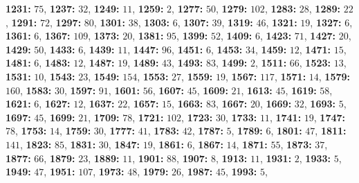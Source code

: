 \textsf{\bfseries 1231:} $75$, \textsf{\bfseries 1237:} $32$, \textsf{\bfseries 1249:} $11$, \textsf{\bfseries 1259:} $2$, \textsf{\bfseries 1277:} $50$, \textsf{\bfseries 1279:} $102$, \textsf{\bfseries 1283:} $28$, \textsf{\bfseries 1289:} $22$, \textsf{\bfseries 1291:} $72$, \textsf{\bfseries 1297:} $80$, \textsf{\bfseries 1301:} $38$, \textsf{\bfseries 1303:} $6$, \textsf{\bfseries 1307:} $39$, \textsf{\bfseries 1319:} $46$, \textsf{\bfseries 1321:} $19$, \textsf{\bfseries 1327:} $6$, \textsf{\bfseries 1361:} $6$, \textsf{\bfseries 1367:} $109$, \textsf{\bfseries 1373:} $20$, \textsf{\bfseries 1381:} $95$, \textsf{\bfseries 1399:} $52$, \textsf{\bfseries 1409:} $6$, \textsf{\bfseries 1423:} $71$, \textsf{\bfseries 1427:} $20$, \textsf{\bfseries 1429:} $50$, \textsf{\bfseries 1433:} $6$, \textsf{\bfseries 1439:} $11$, \textsf{\bfseries 1447:} $96$, \textsf{\bfseries 1451:} $6$, \textsf{\bfseries 1453:} $34$, \textsf{\bfseries 1459:} $12$, \textsf{\bfseries 1471:} $15$, \textsf{\bfseries 1481:} $6$, \textsf{\bfseries 1483:} $12$, \textsf{\bfseries 1487:} $19$, \textsf{\bfseries 1489:} $43$, \textsf{\bfseries 1493:} $83$, \textsf{\bfseries 1499:} $2$, \textsf{\bfseries 1511:} $66$, \textsf{\bfseries 1523:} $13$, \textsf{\bfseries 1531:} $10$, \textsf{\bfseries 1543:} $23$, \textsf{\bfseries 1549:} $154$, \textsf{\bfseries 1553:} $27$, \textsf{\bfseries 1559:} $19$, \textsf{\bfseries 1567:} $117$, \textsf{\bfseries 1571:} $14$, \textsf{\bfseries 1579:} $160$, \textsf{\bfseries 1583:} $30$, \textsf{\bfseries 1597:} $91$, \textsf{\bfseries 1601:} $56$, \textsf{\bfseries 1607:} $45$, \textsf{\bfseries 1609:} $21$, \textsf{\bfseries 1613:} $45$, \textsf{\bfseries 1619:} $58$, \textsf{\bfseries 1621:} $6$, \textsf{\bfseries 1627:} $12$, \textsf{\bfseries 1637:} $22$, \textsf{\bfseries 1657:} $15$, \textsf{\bfseries 1663:} $83$, \textsf{\bfseries 1667:} $20$, \textsf{\bfseries 1669:} $32$, \textsf{\bfseries 1693:} $5$, \textsf{\bfseries 1697:} $45$, \textsf{\bfseries 1699:} $21$, \textsf{\bfseries 1709:} $78$, \textsf{\bfseries 1721:} $102$, \textsf{\bfseries 1723:} $30$, \textsf{\bfseries 1733:} $11$, \textsf{\bfseries 1741:} $19$, \textsf{\bfseries 1747:} $78$, \textsf{\bfseries 1753:} $14$, \textsf{\bfseries 1759:} $30$, \textsf{\bfseries 1777:} $41$, \textsf{\bfseries 1783:} $42$, \textsf{\bfseries 1787:} $5$, \textsf{\bfseries 1789:} $6$, \textsf{\bfseries 1801:} $47$, \textsf{\bfseries 1811:} $141$, \textsf{\bfseries 1823:} $85$, \textsf{\bfseries 1831:} $30$, \textsf{\bfseries 1847:} $19$, \textsf{\bfseries 1861:} $6$, \textsf{\bfseries 1867:} $14$, \textsf{\bfseries 1871:} $55$, \textsf{\bfseries 1873:} $37$, \textsf{\bfseries 1877:} $66$, \textsf{\bfseries 1879:} $23$, \textsf{\bfseries 1889:} $11$, \textsf{\bfseries 1901:} $88$, \textsf{\bfseries 1907:} $8$, \textsf{\bfseries 1913:} $11$, \textsf{\bfseries 1931:} $2$, \textsf{\bfseries 1933:} $5$, \textsf{\bfseries 1949:} $47$, \textsf{\bfseries 1951:} $107$, \textsf{\bfseries 1973:} $48$, \textsf{\bfseries 1979:} $26$, \textsf{\bfseries 1987:} $45$, \textsf{\bfseries 1993:} $5$, 
